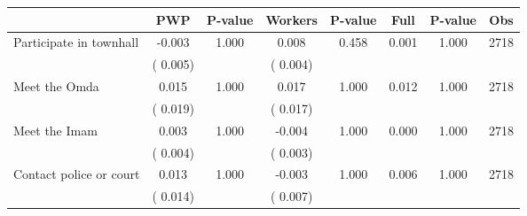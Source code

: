 
\begin{tabular}{l*{7}{c}}\hline&\multicolumn{1}{c}{PWP}&\multicolumn{1}{c}{P-value}&\multicolumn{1}{c}{Workers}&\multicolumn{1}{c}{P-value}&\multicolumn{1}{c}{Full}&\multicolumn{1}{c}{P-value}&\multicolumn{1}{c}{Obs} \\ \hline

 Participate in townhall       &             -0.003       &        1.000  &              0.008       &        0.458  &              0.001       &              1.000 &  2718 \\ 
                       &       (       0.005)             &                               &       (       0.004)                     &                               &                                               &                                &                      \\ 

 Meet the Omda       &              0.015       &        1.000  &              0.017       &        1.000  &              0.012       &              1.000 &  2718 \\ 
                       &       (       0.019)             &                               &       (       0.017)                     &                               &                                               &                                &                      \\ 

 Meet the Imam       &              0.003       &        1.000  &             -0.004       &        1.000  &              0.000       &              1.000 &  2718 \\ 
                       &       (       0.004)             &                               &       (       0.003)                     &                               &                                               &                                &                      \\ 

 Contact police or court       &              0.013       &        1.000  &             -0.003       &        1.000  &              0.006       &              1.000 &  2718 \\ 
                       &       (       0.014)             &                               &       (       0.007)                     &                               &                                               &                                &                      \\ 


\end{tabular}
